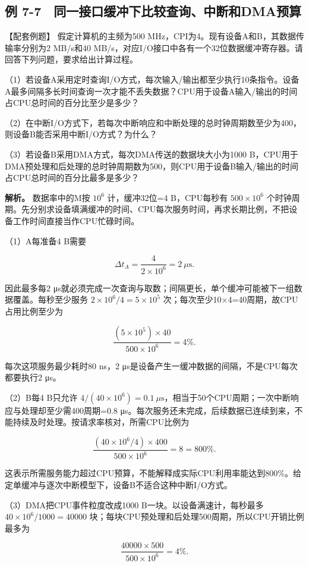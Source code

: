 \subsection{例 7-7　同一接口缓冲下比较查询、中断和DMA预算}\label{CO07-example-7}

【配套例题】 假定计算机的主频为500 MHz，CPI为4。现有设备A和B，其数据传输率分别为2 MB/s和40 MB/s，对应I/O接口中各有一个32位数据缓冲寄存器。请回答下列问题，要求给出计算过程。

（1）若设备A采用定时查询I/O方式，每次输入/输出都至少执行10条指令。设备A最多间隔多长时间查询一次才能不丢失数据？CPU用于设备A输入/输出的时间占CPU总时间的百分比至少是多少？

（2）在中断I/O方式下，若每次中断响应和中断处理的总时钟周期数至少为400，则设备B能否采用中断I/O方式？为什么？

（3）若设备B采用DMA方式，每次DMA传送的数据块大小为1000 B，CPU用于DMA预处理和后处理的总时钟周期数为500，则CPU用于设备B输入/输出的时间占CPU总时间的百分比最多是多少？

\textbf{解析。} 数据率中的M按 \(10^6\) 计，缓冲32位=4 B，CPU每秒有 \(500\times10^6\) 个时钟周期。先分别求设备填满缓冲的时间、CPU每次服务时间，再求长期比例，不把设备工作时间直接当作CPU忙碌时间。

（1）A每准备4 B需要

\[
\Delta t_A=\frac4{2\times10^6}=2\ \mu\mathrm s.
\]

因此最多每2 μs就必须完成一次查询与取数；间隔更长，单个缓冲可能被下一组数据覆盖。每秒至少服务 \(2\times10^6/4=5\times10^5\) 次；每次至少10\ensuremath{\times}4=40周期，故CPU占用比例至少为

\[
\frac{(5\times10^5)\times40}{500\times10^6}=4\%.
\]

每次这项服务最少耗时80 ns，2 μs是设备产生一缓冲数据的间隔，不是CPU每次都要执行2 μs。

（2）B每4 B只允许 \(4/(40\times10^6)=0.1\ \mu\mathrm s\)，相当于50个CPU周期；一次中断响应与处理却至少需400周期=0.8 μs。每次服务还未完成，后续数据已连续到来，不能持续及时处理。按请求率核对，所需CPU比例为

\[
\frac{(40\times10^6/4)\times400}{500\times10^6}=8=800\%.
\]

这表示所需服务能力超过CPU预算，不能解释成实际CPU利用率能达到800\%。给定单缓冲与逐次中断模型下，设备B不适合这种中断I/O方式。

（3）DMA把CPU事件粒度改成1000 B一块。以设备满速计，每秒最多 \(40\times10^6/1000=40000\) 块；每块CPU预处理和后处理500周期，所以CPU开销比例最多为

\[
\frac{40000\times500}{500\times10^6}=4\%.
\]

